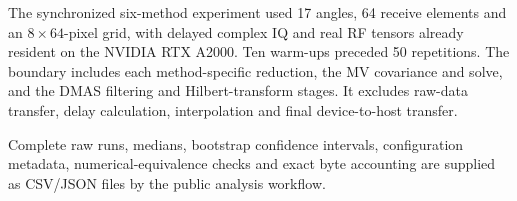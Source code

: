 \documentclass[10pt]{article}
\begin{document}
\begin{table}[h]
\centering
\caption{Preloaded-kernel and host-stacked-input controls. Transfer is the
exact logical timed payload; the within-control ratio is relative to DAS.}
\label{tab:s12-controls}
\resizebox{\textwidth}{!}{}
\end{table}

The synchronized six-method experiment used 17 angles, 64 receive elements and
an $8\times64$-pixel grid, with delayed complex IQ and real RF tensors already
resident on the NVIDIA RTX A2000. Ten warm-ups preceded 50 repetitions. The
boundary includes each method-specific reduction, the MV covariance and solve,
and the DMAS filtering and Hilbert-transform stages. It excludes raw-data
transfer, delay calculation, interpolation and final device-to-host transfer.

\begin{table}[h]
\centering
\caption{Median post-delay GPU kernel times and leading arithmetic orders.
$M$ is the active element count, $L$ the MV subarray length and $K$ its axial
half-window.}
\label{tab:s12-timing}
\resizebox{\textwidth}{!}{}
\end{table}

Complete raw runs, medians, bootstrap confidence intervals, configuration
metadata, numerical-equivalence checks and exact byte accounting are supplied
as CSV/JSON files by the public analysis workflow.
\end{document}
